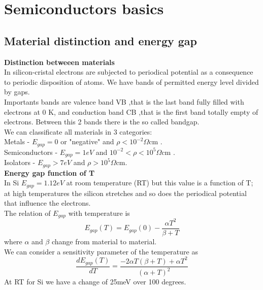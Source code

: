 \chapter{Semiconductors basics}
\section{Material distinction and energy gap}
{\bf Distinction betweeen materials}\\
In silicon-cristal electrons are subjected to periodical potential as a consequence to periodic disposition of atoms. We have bands of permitted energy level divided by gaps.\\
Importants bands are valence band VB ,that is the last band fully filled with electrons at 0 K, and conduction band CB ,that is the first band totally empty of electrons. Between this 2 bands there is the so called bandgap.\\
We can classificate all materials in 3 categories:\\
Metals           - $E_{gap}=0$ or "negative" and $\rho<10^{-2} \Omega$cm .\\ 
Semiconductors   - $E_{gap}=1eV$ and $10^{-2}<\rho<10^{5} \Omega$cm .\\
Isolators        - $E_{gap}>7eV$ and $\rho>10^{5} \Omega$cm.\\
\newline
{\bf Energy gap function of T}\\
In Si $E_{gap}=1.12eV$ at room temperature (RT) but this value is a function of T; at high temperatures the silicon stretches and so does the periodical potential that influence the electrons.\\ 
The relation of $E_{gap}$ with temperature is
\begin{equation}
E_{gap}(T)=E_{gap}(0)-\frac{\alpha T^2}{\beta + T}
\end{equation}
where $\alpha$ and $\beta$ change from material to material.\\
We can consider a sensitivity parameter of the temperature as 
\begin{equation}
\frac{dE_{gap}(T)}{dT}=\frac{-2\alpha T(\beta+T)+\alpha T^2}{(\alpha + T)^2}
\end{equation}
At RT for Si we have a change of 25meV over 100 degrees.\\
\newline
